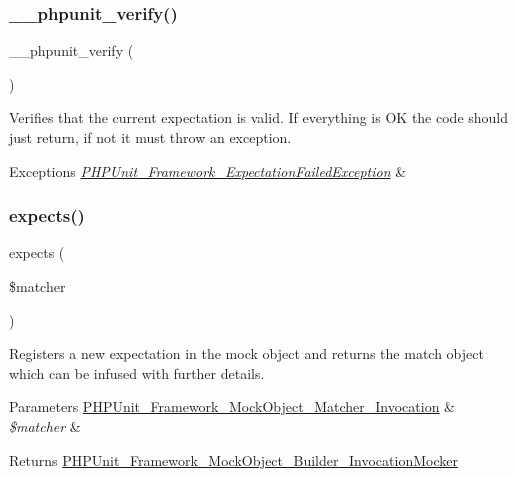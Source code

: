 \subsubsection{\texorpdfstring{\+\_\+\+\_\+phpunit\+\_\+verify()}{\_\_phpunit\_verify()}}
{\footnotesize\ttfamily \+\_\+\+\_\+phpunit\+\_\+verify (\begin{DoxyParamCaption}{ }\end{DoxyParamCaption})}

Verifies that the current expectation is valid. If everything is OK the code should just return, if not it must throw an exception.


\begin{DoxyExceptions}{Exceptions}
{\em \mbox{\hyperlink{class_p_h_p_unit___framework___expectation_failed_exception}{P\+H\+P\+Unit\+\_\+\+Framework\+\_\+\+Expectation\+Failed\+Exception}}} & \\
\hline
\end{DoxyExceptions}
\mbox{\label{interface_p_h_p_unit___framework___mock_object___mock_object_a1776bc980be5adac247b2a4ab1152128}} 
\subsubsection{\texorpdfstring{expects()}{expects()}}
{\footnotesize\ttfamily expects (\begin{DoxyParamCaption}\item[{\mbox{\hyperlink{interface_p_h_p_unit___framework___mock_object___matcher___invocation}{P\+H\+P\+Unit\+\_\+\+Framework\+\_\+\+Mock\+Object\+\_\+\+Matcher\+\_\+\+Invocation}}}]{\$matcher }\end{DoxyParamCaption})}

Registers a new expectation in the mock object and returns the match object which can be infused with further details.


\begin{DoxyParams}[1]{Parameters}
\mbox{\hyperlink{interface_p_h_p_unit___framework___mock_object___matcher___invocation}{P\+H\+P\+Unit\+\_\+\+Framework\+\_\+\+Mock\+Object\+\_\+\+Matcher\+\_\+\+Invocation}} & {\em \$matcher} & \\
\hline
\end{DoxyParams}
\begin{DoxyReturn}{Returns}
\mbox{\hyperlink{class_p_h_p_unit___framework___mock_object___builder___invocation_mocker}{P\+H\+P\+Unit\+\_\+\+Framework\+\_\+\+Mock\+Object\+\_\+\+Builder\+\_\+\+Invocation\+Mocker}} 
\end{DoxyReturn}



